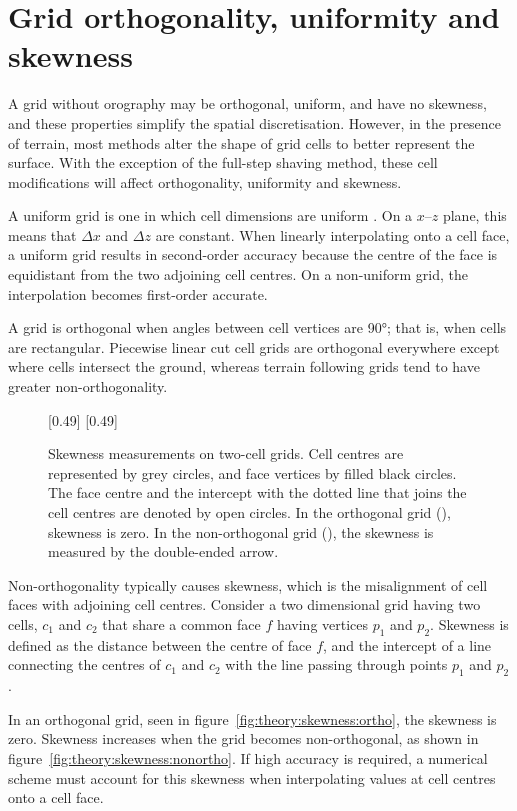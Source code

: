 \section{Grid orthogonality, uniformity and skewness}
\label{sec:theory:skewness}

A grid without orography may be orthogonal, uniform, and have no skewness, and these properties simplify the spatial discretisation.  However, in the presence of terrain, most methods alter the shape of grid cells to better represent the surface.  With the exception of the full-step shaving method, these cell modifications will affect orthogonality, uniformity and skewness.

A uniform grid is one in which cell dimensions are uniform \autocite{leveque2002}.  On a $x$--$z$ plane, this means that $\Delta x$ and $\Delta z$ are constant.  When linearly interpolating onto a cell face, a uniform grid results in second-order accuracy because the centre of the face is equidistant from the two adjoining cell centres.  On a non-uniform grid, the interpolation becomes first-order accurate.

A grid is orthogonal when angles between cell vertices are \ang{90}; that is, when cells are rectangular.  Piecewise linear cut cell grids are orthogonal everywhere except where cells intersect the ground, whereas terrain following grids tend to have greater non-orthogonality.

\begin{figure}
	\captionsetup[subfigure]{position=b}
	\centering
	[0.49\textwidth]{\vspace{1em}}
	\hfill
	[0.49\textwidth]{}
%
	\caption{Skewness measurements on two-cell grids.  Cell centres are represented by grey circles, and face vertices by filled black circles.  The face centre and the intercept with the dotted line that joins the cell centres are denoted by open circles.  In the orthogonal grid (), skewness is zero.  In the non-orthogonal grid (), the skewness is measured by the double-ended arrow.}
	\label{fig:theory:skewness}
\end{figure}

Non-orthogonality typically causes skewness, which is the misalignment of cell faces with adjoining cell centres.
Consider a two dimensional grid having two cells, $c_1$ and $c_2$ that share a common face $f$ having vertices $p_1$ and $p_2$.  Skewness is defined as the distance between the centre of face $f$, and the intercept of a line connecting the centres of $c_1$ and $c_2$ with the line passing through points $p_1$ and $p_2$ \autocite{moraes2013}.

In an orthogonal grid, seen in figure~\ref{fig:theory:skewness:ortho}, the skewness is zero.  Skewness increases when the grid becomes non-orthogonal, as shown in figure~\ref{fig:theory:skewness:nonortho}.  If high accuracy is required, a numerical scheme must account for this skewness when interpolating values at cell centres onto a cell face.
